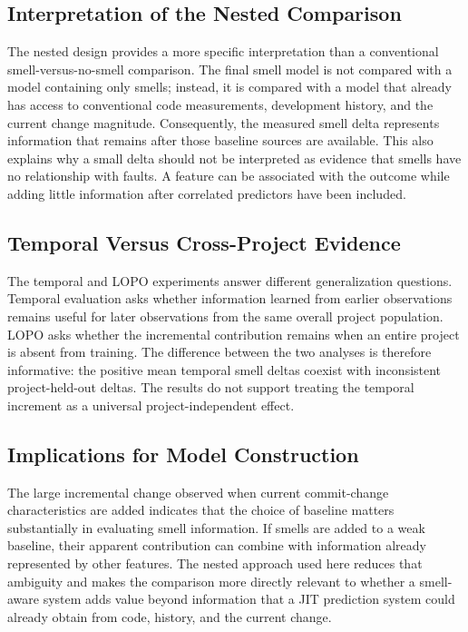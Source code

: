 \documentclass[conference]{IEEEtran}
\begin{document}
\subsection{Interpretation of the Nested Comparison}
The nested design provides a more specific interpretation than a conventional smell-versus-no-smell comparison. The final smell model is not compared with a model containing only smells; instead, it is compared with a model that already has access to conventional code measurements, development history, and the current change magnitude. Consequently, the measured smell delta represents information that remains after those baseline sources are available. This also explains why a small delta should not be interpreted as evidence that smells have no relationship with faults. A feature can be associated with the outcome while adding little information after correlated predictors have been included.

\subsection{Temporal Versus Cross-Project Evidence}
The temporal and LOPO experiments answer different generalization questions. Temporal evaluation asks whether information learned from earlier observations remains useful for later observations from the same overall project population. LOPO asks whether the incremental contribution remains when an entire project is absent from training. The difference between the two analyses is therefore informative: the positive mean temporal smell deltas coexist with inconsistent project-held-out deltas. The results do not support treating the temporal increment as a universal project-independent effect.

\subsection{Implications for Model Construction}
The large incremental change observed when current commit-change characteristics are added indicates that the choice of baseline matters substantially in evaluating smell information. If smells are added to a weak baseline, their apparent contribution can combine with information already represented by other features. The nested approach used here reduces that ambiguity and makes the comparison more directly relevant to whether a smell-aware system adds value beyond information that a JIT prediction system could already obtain from code, history, and the current change.
\end{document}

